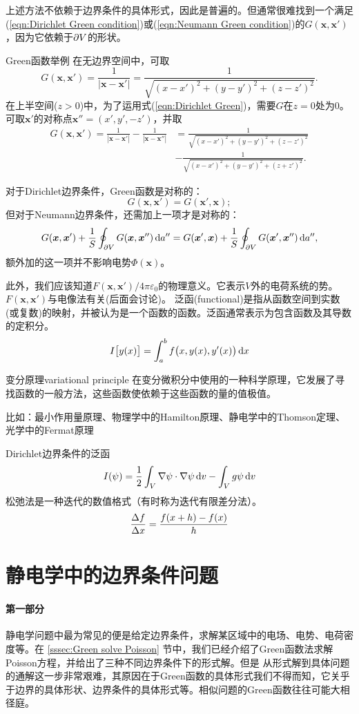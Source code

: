 上述方法不依赖于边界条件的具体形式，因此是普遍的。但通常很难找到一个满足(\ref{eqn:Dirichlet Green condition})或(\ref{eqn:Neumann Green condition})的$G(\bm x, \bm x')$，因为它依赖于$\partial V$的形状。
\begin{example}{Green函数举例}{}
    在无边界空间中，可取
    \[
        G(\bm x,\bm x')=\frac1{|\bm x-\bm x'|}=\frac1{\sqrt{(x-x')^2+(y-y')^2+(z-z')^2}}.
    \]
    在上半空间($z>0$)中，为了运用式(\ref{eqn:Dirichlet Green})，需要$G$在$z=0$处为0。可取$\bm x'$的对称点$\bm x''=(x',y',-z')$，并取
    \begin{align*}
        G(\bm x,\bm x')=\frac1{|\bm x-\bm x'|}-\frac1{|\bm x-\bm x''|}&=\frac1{\sqrt{(x-x')^2+(y-y')^2+(z-z')^2}}\\
        &-\frac1{\sqrt{(x-x')^2+(y-y')^2+(z+z')^2}}.
    \end{align*}
\end{example}
对于Dirichlet边界条件，Green函数是对称的：
\[
    G(\bm x,\bm x')=G(\bm x',\bm x);
\]
但对于Neumann边界条件，还需加上一项才是对称的：
\[
    G(\bm x,\bm x')+\frac1S\oint_{\partial V}G(\bm x,\bm x'')\mathop{}\!\mathrm{d} a''=G(\bm x',\bm x)+\frac1S\oint_{\partial V}G(\bm x',\bm x'')\mathop{}\!\mathrm{d} a'',
\]
额外加的这一项并不影响电势$\Phi(\bm x)$。

此外，我们应该知道$F(\bm x, \bm x')/4\pi\varepsilon_0$的物理意义。它表示$V$外的电荷系统的势。$F(\bm x, \bm x')$与电像法有关(后面会讨论)。
泛函(functional)是指从函数空间到实数(或复数)的映射，并被认为是一个函数的函数。泛函通常表示为包含函数及其导数的定积分。
\begin{align}
    I\bigl[y(x)\bigr]=\int_a^bf\bigl(x,y(x),y'(x)\bigr)\mathop{}\!\mathrm{d} x
\end{align}
\begin{definition}{变分原理}{variational principle}
    在变分微积分中使用的一种科学原理，它发展了寻找函数的一般方法，这些函数使依赖于这些函数的量的值极值。

    比如：最小作用量原理、物理学中的Hamilton原理、静电学中的Thomson定理、光学中的Fermat原理
\end{definition}
Dirichlet边界条件的泛函
\[
    I(\psi)=\frac12\int_V\nabla\psi\cdot\nabla\psi\mathop{}\!\mathrm{d} v-\int_Vg\psi\mathop{}\!\mathrm{d} v
\]
松弛法是一种迭代的数值格式（有时称为迭代有限差分法）。
\[
    \frac{\Delta f}{\Delta x}=\frac{f(x+h)-f(x)}h
\]
\clearpage
\section{静电学中的边界条件问题}
\label{sec:boundary-value problems}
\paragraph{第一部分}
静电学问题中最为常见的便是给定边界条件，求解某区域中的电场、电势、电荷密度等。在 \ref{sssec:Green solve Poisson} 节中，我们已经介绍了Green函数法求解Poisson方程，并给出了三种不同边界条件下的形式解。但是%
从形式解到具体问题的通解这一步非常艰难，其原因在于Green函数的具体形式我们不得而知，它关乎于边界的具体形状、边界条件的具体形式等。相似问题的Green函数往往可能大相径庭。

